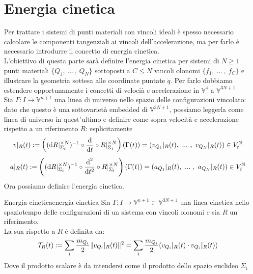 \documentclass[openany]{book}
\renewcommand\V{\mathbb{V}}
\begin{document}
\newpage
\newcommand\T{\mc{T}}
\section{Energia cinetica}

Per trattare i sistemi di punti materiali con vincoli ideali è spesso necessario calcolare le componenti tangenziali ai vincoli dell'accelerazione, ma per farlo è necessario introdurre il concetto di energia cinetica.\\
L'obiettivo di questa parte sarà definire l'energia cinetica per sistemi di $N\ge 1$ punti materiali $\{Q_1,\ ...\ ,\ Q_N\}$ sottoposti a $C\le N$ vincoli olonomi $\{f_1,\ ...\ ,\ f_C\}$ e illustrare la geometria sottesa alle coordinate puntate $\dot q$. Per farlo dobbiamo estendere opportunamente i concetti di velocià e accelerazione in $\V^4$ a $\V^{3N+1}$\\
Sia $\Gamma:I\to \V^{n+1}$ una linea di universo nello spazio delle configurazioni vincolato: dato che questo è una sottovarietà embedded di $\V^{3N+1}$, possiamo leggerla come linea di universo in quest'ultimo e definire come sopra velocità e accelerazione rispetto a un riferimento $R$: esplicitamente
\[ v|_R(t) := \left((\di R|_{\Sigma_t}^{\times N})^{-1}\circ \frac{\di}{\di t} \circ R|_{\Sigma_t}^{\times N} \right)(\Gamma(t)) = (v_{Q_1}|_R(t),\ ...\ ,\  v_{Q_N}|_R(t)) \in V_t^\N \]
\[ a|_R(t) := \left((\text{d} R|_{\Sigma_t}^{\times N})^{-1}\circ \frac{\text{d}^2}{\text{d} t^2} \circ R|_{\Sigma_t}^{\times N} \right)(\Gamma(t)) = (a_{Q_1}|_R(t),\ ...\ ,\  a_{Q_N}|_R(t)) \in V_t^{\mathbb{N}} \]
Ora possiamo definire l'energia cinetica.

\begin{definition}{Energia cinetica}{energia cinetica}
    Sia $\Gamma:I\to\V^{n+1}\subset\V^{3N+1}$ una linea cinetica nello spaziotempo delle configurazioni di un sistema con vincoli olonomi e sia $R$ un riferimento.\\
    La sua  rispetto a $R$ è definita da:
    \[ \T_R(t) := \sum_i \frac{m_{Q_i}}{2}\| v_{Q_i}|_R(t) \|^2 =  \sum_i \frac{m_{Q_i}}{2}(v_{Q_i}|_R(t) \cdot v_{Q_i}|_R(t)) \]
    Dove il prodotto scalare è da intendersi come il prodotto dello spazio euclideo $\Sigma_t$
\end{definition}
\end{document}
